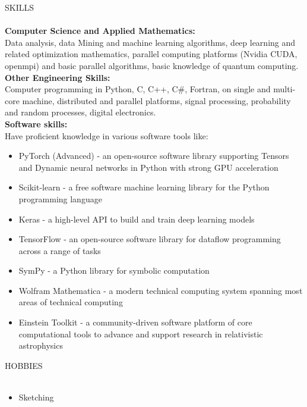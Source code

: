 \documentclass[a4paper]{article}
\newcommand{\lineunder} {
    \vspace*{-8pt} \\
    \hspace*{-18pt} \hrulefill \\
}
\newcommand{\header} [1] {
    {\hspace*{-18pt}\vspace*{6pt} \textsc{#1}}
    \vspace*{-6pt} \lineunder
}
\begin{document}
\header{SKILLS}
\textbf{Computer Science and Applied Mathematics: }\\
Data analysis, data Mining and machine learning algorithms, deep learning and related optimization mathematics, parallel computing platforms (Nvidia CUDA, openmpi) and basic parallel algorithms, basic knowledge of quantum computing. \\
\vspace*{2mm}
\textbf{Other Engineering Skills: } \\
Computer programming in Python, C, C++, C\#, Fortran, on single and multi-core machine, distributed and parallel platforms, signal processing, probability and random processes, digital electronics. \\
\vspace*{2mm}
\textbf{Software skills: }\\
Have proficient knowledge in various software tools like:
\begin{itemize} \itemsep 1pt
    \item PyTorch (Advanced) - an open-source software library supporting Tensors and Dynamic neural networks in Python with strong GPU acceleration \\
    \item Scikit-learn - a free software machine learning library for the Python programming language \\
    \item  Keras - a high-level API to build and train deep learning models \\
    \item TensorFlow - an open-source software library for dataflow programming across a range of tasks \\
    \item SymPy - a Python library for symbolic computation \\
    \item Wolfram Mathematica - a modern technical computing system spanning most areas of technical computing \\
    \item Einstein Toolkit - a community-driven software platform of core computational tools to advance and support research in relativistic astrophysics \\
\end{itemize}
\vspace{2mm}

\header{HOBBIES}
\begin{itemize}
\item Sketching
\end{itemize}
\vspace{2mm}
\ 
\end{document}
